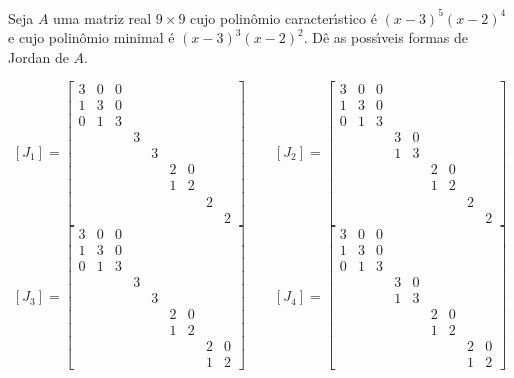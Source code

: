 \documentclass[12pt]{exam}
\begin{document}
\begin{exercicio}
  Seja $A$ uma matriz real $9 \times 9$ cujo polin\^omio caracter{\'\i}stico \'e $(x - 3)^5(x - 2)^4$ e cujo polin\^omio minimal \'e $(x - 3)^3(x - 2)^2$. D\^e as poss{\'\i}veis formas de Jordan de $A$.
  \begin{solucao}
    \[
      [J_1] = \begin{bmatrix}
        3 & 0 & 0\\
        1 & 3 & 0\\
        0 & 1 & 3\\
        & & & 3\\
        & & & & 3\\
        & & & & & 2 & 0\\
        & & & & & 1 & 2\\
        & & & & & & & 2\\
        & & & & & & & & 2
      \end{bmatrix}\qquad
      [J_2] = \begin{bmatrix}
        3 & 0 & 0\\
        1 & 3 & 0\\
        0 & 1 & 3\\
        & & & 3 & 0\\
        & & & 1 & 3\\
        & & & & & 2 & 0\\
        & & & & & 1 & 2\\
        & & & & & & & 2\\
        & & & & & & & & 2
      \end{bmatrix}
    \]
    \[
      [J_3] = \begin{bmatrix}
        3 & 0 & 0\\
        1 & 3 & 0\\
        0 & 1 & 3\\
        & & & 3\\
        & & & & 3\\
        & & & & & 2 & 0\\
        & & & & & 1 & 2\\
        & & & & & & & 2 & 0\\
        & & & & & & & 1 & 2
      \end{bmatrix}\qquad
      [J_4] = \begin{bmatrix}
        3 & 0 & 0\\
        1 & 3 & 0\\
        0 & 1 & 3\\
        & & & 3 & 0\\
        & & & 1 & 3\\
        & & & & & 2 & 0\\
        & & & & & 1 & 2\\
        & & & & & & & 2 & 0\\
        & & & & & & & 1 & 2
      \end{bmatrix}
    \]
  \end{solucao}
\end{exercicio}
\end{document}
